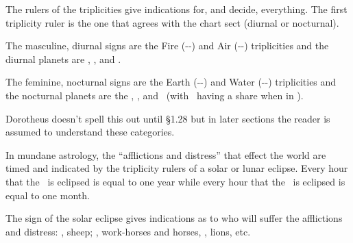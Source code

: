 The rulers of the triplicities give indications for, and decide, everything. The first triplicity ruler is the one that agrees with the chart sect (diurnal or nocturnal).

\begin{mdframed}[backgroundcolor=cyan!5, rightmargin=1em, leftmargin=1em]
\footnotesize
The masculine, diurnal signs are the Fire (\Aries-\Leo-\Sagittarius) and Air (\Gemini-\Libra-\Aquarius) triplicities and the diurnal planets are \Sun, \Jupiter, and \Saturn.

The feminine, nocturnal signs are the Earth (\Taurus-\Virgo-\Capricorn) and Water (\Cancer-\Scorpio-\Pisces) triplicities and the nocturnal planets are the \Moon, \Venus, and \Mars\, (with \Mercury\, having a share when in \Virgo).

Dorotheus doesn't spell this out until \S{1.28} but in later sections the reader is assumed to understand these categories.
\end{mdframed}

In mundane astrology, the ``afflictions and distress'' that effect the world are timed and indicated by the triplicity rulers of a solar or lunar eclipse. Every hour that the \Sun\, is eclipsed is equal to one year while every hour that the \Moon\, is eclipsed is equal to one month.

The sign of the solar eclipse gives indications as to who will suffer the afflictions and distress: \Aries, sheep; \Sagittarius, work-horses and horses, \Leo, lions, etc.
